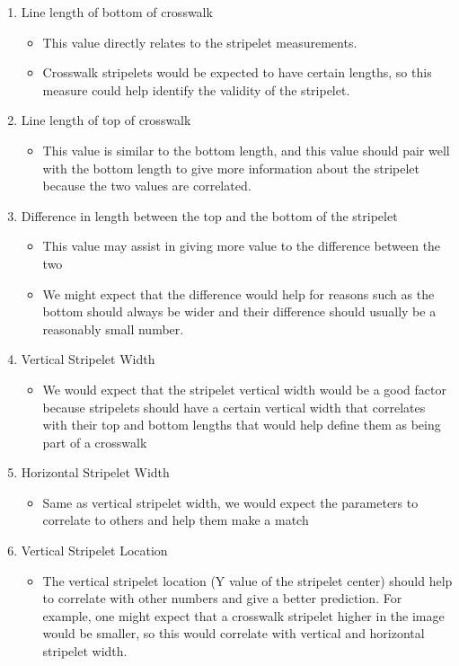 \documentclass[12pt]{ucthesis}
\begin{document}
\begin{enumerate}
   \item Line length of bottom of crosswalk
   \begin{itemize}
     \item This value directly relates to the stripelet measurements.
     \item Crosswalk stripelets would be expected to have certain lengths, so this measure could help identify the validity of the stripelet.
   \end{itemize}
   \item Line length of top of crosswalk
   \begin{itemize}
     \item This value is similar to the bottom length, and this value should pair well with the bottom length to give more information about the stripelet because the two values are correlated.
   \end{itemize}
   \item Difference in length between the top and the bottom of the stripelet
   \begin{itemize}
     \item This value may assist in giving more value to the difference between the two
     \item We might expect that the difference would help for reasons such as the bottom should always be wider and their difference should usually be a reasonably small number. 
   \end{itemize}
   \item Vertical Stripelet Width
   \begin{itemize}
     \item We would expect that the stripelet vertical width would be a good factor because stripelets should have a certain vertical width that correlates with their top and bottom lengths that would help define them as being part of a crosswalk
   \end{itemize}
   \item Horizontal Stripelet Width
   \begin{itemize}
     \item Same as vertical stripelet width, we would expect the parameters to correlate to others and help them make a match
   \end{itemize}
   \item Vertical Stripelet Location
   \begin{itemize}
     \item The vertical stripelet location (Y value of the stripelet center) should help to correlate with other numbers and give a better prediction. For example, one might expect that a crosswalk stripelet higher in the image would be smaller, so this would correlate with vertical and horizontal stripelet width. 

\end{itemize}
\end{enumerate}
\end{document}
